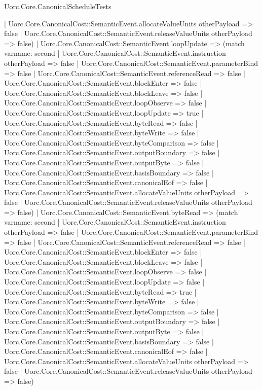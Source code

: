 \begin{lexlean}{Uorc.Core.CanonicalScheduleTests}
\begin{semanticmodule}
{      | Uorc.Core.CanonicalCost::SemanticEvent.allocateValueUnits otherPayload => false
      | Uorc.Core.CanonicalCost::SemanticEvent.releaseValueUnits otherPayload => false)
    | Uorc.Core.CanonicalCost::SemanticEvent.loopUpdate => (match var{name: second}
      | Uorc.Core.CanonicalCost::SemanticEvent.instruction otherPayload => false
      | Uorc.Core.CanonicalCost::SemanticEvent.parameterBind => false
      | Uorc.Core.CanonicalCost::SemanticEvent.referenceRead => false
      | Uorc.Core.CanonicalCost::SemanticEvent.blockEnter => false
      | Uorc.Core.CanonicalCost::SemanticEvent.blockLeave => false
      | Uorc.Core.CanonicalCost::SemanticEvent.loopObserve => false
      | Uorc.Core.CanonicalCost::SemanticEvent.loopUpdate => true
      | Uorc.Core.CanonicalCost::SemanticEvent.byteRead => false
      | Uorc.Core.CanonicalCost::SemanticEvent.byteWrite => false
      | Uorc.Core.CanonicalCost::SemanticEvent.byteComparison => false
      | Uorc.Core.CanonicalCost::SemanticEvent.outputBoundary => false
      | Uorc.Core.CanonicalCost::SemanticEvent.outputByte => false
      | Uorc.Core.CanonicalCost::SemanticEvent.basisBoundary => false
      | Uorc.Core.CanonicalCost::SemanticEvent.canonicalEof => false
      | Uorc.Core.CanonicalCost::SemanticEvent.allocateValueUnits otherPayload => false
      | Uorc.Core.CanonicalCost::SemanticEvent.releaseValueUnits otherPayload => false)
    | Uorc.Core.CanonicalCost::SemanticEvent.byteRead => (match var{name: second}
      | Uorc.Core.CanonicalCost::SemanticEvent.instruction otherPayload => false
      | Uorc.Core.CanonicalCost::SemanticEvent.parameterBind => false
      | Uorc.Core.CanonicalCost::SemanticEvent.referenceRead => false
      | Uorc.Core.CanonicalCost::SemanticEvent.blockEnter => false
      | Uorc.Core.CanonicalCost::SemanticEvent.blockLeave => false
      | Uorc.Core.CanonicalCost::SemanticEvent.loopObserve => false
      | Uorc.Core.CanonicalCost::SemanticEvent.loopUpdate => false
      | Uorc.Core.CanonicalCost::SemanticEvent.byteRead => true
      | Uorc.Core.CanonicalCost::SemanticEvent.byteWrite => false
      | Uorc.Core.CanonicalCost::SemanticEvent.byteComparison => false
      | Uorc.Core.CanonicalCost::SemanticEvent.outputBoundary => false
      | Uorc.Core.CanonicalCost::SemanticEvent.outputByte => false
      | Uorc.Core.CanonicalCost::SemanticEvent.basisBoundary => false
      | Uorc.Core.CanonicalCost::SemanticEvent.canonicalEof => false
      | Uorc.Core.CanonicalCost::SemanticEvent.allocateValueUnits otherPayload => false
      | Uorc.Core.CanonicalCost::SemanticEvent.releaseValueUnits otherPayload => false)
}
\end{semanticmodule}
\end{lexlean}
